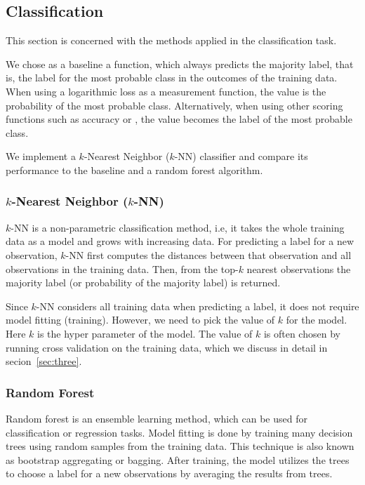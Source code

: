 \subsection{Classification}

This section is concerned with the methods applied in the classification task.

We chose as a baseline a function, which always predicts the majority label,
that is, the label for the most probable class in the outcomes of the training
data.  When using a logarithmic loss as a measurement function, the value is the
probability of the most probable class.  Alternatively, when using other scoring
functions such as accuracy or \fmeasure, the value becomes the label of the most
probable class.

We implement a $k$-Nearest Neighbor ($k$-NN) classifier and compare its
performance to the baseline and a random forest algorithm.

\subsubsection{$k$-Nearest Neighbor ($k$-NN)}

$k$-NN is a non-parametric classification method, i.e, it takes the whole
training data as a model and grows with increasing data.  For predicting a label
for a new observation, $k$-NN first computes the distances between that
observation and all observations in the training data.  Then, from the top-$k$
nearest observations the majority label (or probability of the majority label)
is returned.

Since $k$-NN considers all training data when predicting a label, it does not
require model fitting (training).  However, we need to pick the value of $k$ for
the model.  Here $k$ is the hyper parameter of the model.  The value of $k$ is
often chosen by running cross validation on the training data, which we discuss
in detail in secion~\ref{sec:three}.

\subsubsection{Random Forest}

Random forest is an ensemble learning method, which can be used for
classification or regression tasks.  Model fitting is done by training many
decision trees using random samples from the training data.  This technique is
also known as bootstrap aggregating or bagging.  After training, the model
utilizes the trees to choose a label for a new observations by averaging the
results from trees.

